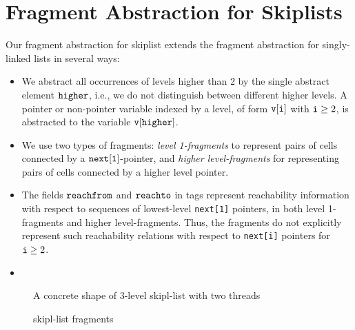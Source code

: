  \section{Fragment Abstraction for  Skiplists}
\label{sect:skiplists}
Our fragment abstraction for skiplist extends the fragment abstraction for
singly-linked lists in several ways:
\begin{itemize}
\item
We abstract all occurrences of levels
higher than 2 by the single abstract element $\tt higher$, i.e., 
we do not distinguish between different higher levels.
  A pointer or non-pointer variable indexed by a level,
  of form $\tt v[i]$ with ${\tt i} \geq 2$, is
  abstracted to the variable $\tt v[higher]$.
\item
  We use two types of fragments: {\em level 1-fragments} to represent pairs of
cells connected by a $\tt next[1]$-pointer, and {\em higher level-fragments} for
representing pairs of cells connected by a higher level pointer.
\item
  The fields $\mathtt{reachfrom}$ and $\mathtt{reachto}$ in tags represent reachability information with respect to sequences of lowest-level {\tt next[1]} pointers, in
  both level 1-fragments and higher level-fragments. Thus, the fragments do
  not explicitly represent such reachability relations with respect to
  {\tt next[i]} pointers for ${\tt i} \geq 2$.
\item
\end{itemize}
 \begin{figure}  
   
 \caption{A concrete shape of 3-level skipl-list with two threads}
\end{figure}

 \begin{figure}  
 
 \caption{skipl-list fragments }
\end{figure}

